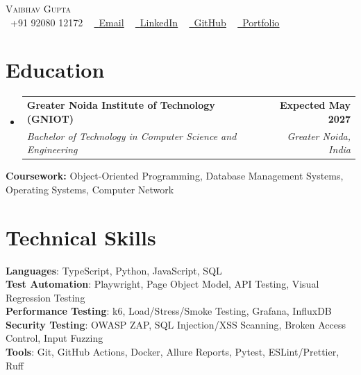 \documentclass[letterpaper,10pt]{article}
\makeatletter
\newcommand{\resumeSubheading}[4]{
  \vspace{-2pt}\item
    \begin{tabular*}{1.0\textwidth}[t]{l@{\extracolsep{\fill}}r}
      \textbf{#1} & \textbf{\small #2} \\
      \textit{\small#3} & \textit{\small #4} \\
    \end{tabular*}\vspace{-7pt}
}
\newcommand{\resumeSubHeadingListStart}{\begin{itemize}[leftmargin=0.0in, label={}]}
\newcommand{\resumeSubHeadingListEnd}{\end{itemize}}
\makeatother
\begin{document}

\begin{center}
    {\Huge \scshape Vaibhav Gupta} \\ \vspace{1pt}
    \small \raisebox{-0.1\height}\faPhone\ +91 92080 12172 ~
    \href{mailto:vaibhv19.business@gmail.com}{\raisebox{-0.2\height}\faEnvelope\ \underline{Email}} ~
    \href{https://linkedin.com/in/vaibhv19}{\raisebox{-0.2\height}\faLinkedin\ \underline{LinkedIn}} ~
    \href{https://github.com/vaibhv19}{\raisebox{-0.2\height}\faGithub\ \underline{GitHub}} ~
    \href{https://vaibhv19.dev}{\raisebox{-0.2\height}\faGlobe\ \underline{Portfolio}}
    \vspace{-8pt}
\end{center}

\section{Education}
  \resumeSubHeadingListStart
    \resumeSubheading
      {Greater Noida Institute of Technology (GNIOT)}{Expected May 2027}
      {Bachelor of Technology in Computer Science and Engineering}{Greater Noida, India}
  \resumeSubHeadingListEnd
  \vspace{-4pt}
  \begin{itemize}[leftmargin=0in, label={}]
    \small{\item{\textbf{Coursework:} Object-Oriented Programming, Database Management Systems, Operating Systems, Computer Network}}
    \vspace{-10pt}
\end{itemize}

\section{Technical Skills}
 \begin{itemize}[leftmargin=0in, label={}]
    \small{\item{
     \textbf{Languages}{: TypeScript, Python, JavaScript, SQL} \\
     \textbf{Test Automation}{: Playwright, Page Object Model, API Testing, Visual Regression Testing} \\
     \textbf{Performance Testing}{: k6, Load/Stress/Smoke Testing, Grafana, InfluxDB} \\
     \textbf{Security Testing}{: OWASP ZAP, SQL Injection/XSS Scanning, Broken Access Control, Input Fuzzing} \\
     \textbf{Tools}{: Git, GitHub Actions, Docker, Allure Reports, Pytest, ESLint/Prettier, Ruff} \\
    }}
 \end{itemize}
 \vspace{-12pt}
\end{document}
